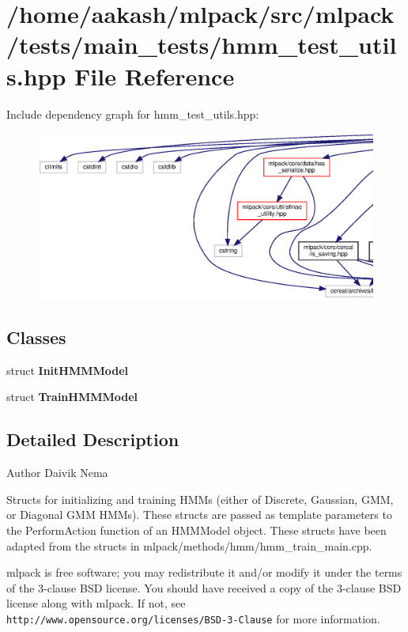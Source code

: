 \section{/home/aakash/mlpack/src/mlpack/tests/main\+\_\+tests/hmm\+\_\+test\+\_\+utils.hpp File Reference}
\label{hmm__test__utils_8hpp}
Include dependency graph for hmm\+\_\+test\+\_\+utils.\+hpp\+:
\nopagebreak
\begin{figure}[H]
\begin{center}
\leavevmode
\includegraphics[width=350pt]{hmm__test__utils_8hpp__incl}
\end{center}
\end{figure}
\subsection*{Classes}
\begin{DoxyCompactItemize}
\item 
struct \textbf{ Init\+H\+M\+M\+Model}
\item 
struct \textbf{ Train\+H\+M\+M\+Model}
\end{DoxyCompactItemize}


\subsection{Detailed Description}
\begin{DoxyAuthor}{Author}
Daivik Nema
\end{DoxyAuthor}
Structs for initializing and training H\+M\+Ms (either of Discrete, Gaussian, G\+MM, or Diagonal G\+MM H\+M\+Ms). These structs are passed as template parameters to the Perform\+Action function of an H\+M\+M\+Model object. These structs have been adapted from the structs in mlpack/methods/hmm/hmm\+\_\+train\+\_\+main.\+cpp.

mlpack is free software; you may redistribute it and/or modify it under the terms of the 3-\/clause B\+SD license. You should have received a copy of the 3-\/clause B\+SD license along with mlpack. If not, see {\tt http\+://www.\+opensource.\+org/licenses/\+B\+S\+D-\/3-\/\+Clause} for more information. 